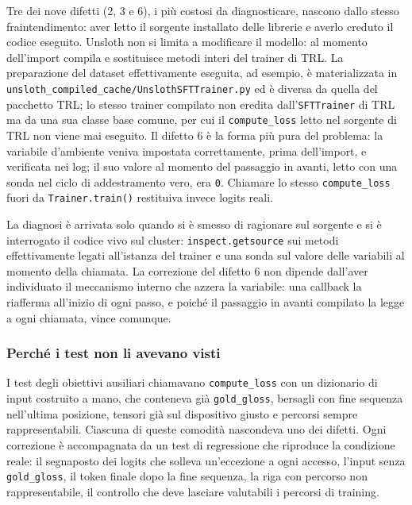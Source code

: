 Tre dei nove difetti (2, 3 e 6), i più costosi da diagnosticare, nascono dallo
stesso fraintendimento: aver letto il sorgente installato delle librerie e
averlo creduto il codice eseguito. Unsloth non si limita a modificare il modello: al
momento dell'import compila e sostituisce metodi interi del trainer di TRL. La
preparazione del dataset effettivamente eseguita, ad esempio, è materializzata
in \texttt{unsloth\_compiled\_cache/UnslothSFTTrainer.py} ed è diversa da quella
del pacchetto TRL; lo stesso trainer compilato non eredita dall'\texttt{SFTTrainer}
di TRL ma da una sua classe base comune, per cui il \texttt{compute\_loss} letto
nel sorgente di TRL non viene mai eseguito. Il difetto 6 è la forma più pura del
problema: la variabile d'ambiente veniva impostata correttamente, prima
dell'import, e verificata nei log; il suo valore al momento del passaggio in
avanti, letto con una sonda nel ciclo di addestramento vero, era \texttt{0}.
Chiamare lo stesso \texttt{compute\_loss} fuori da \texttt{Trainer.train()}
restituiva invece logits reali.

La diagnosi è arrivata solo quando si è smesso di ragionare sul sorgente e si è
interrogato il codice vivo sul cluster: \texttt{inspect.getsource} sui metodi
effettivamente legati all'istanza del trainer e una sonda sul valore delle
variabili al momento della chiamata. La correzione del difetto 6 non dipende
dall'aver individuato il meccanismo interno che azzera la variabile: una
callback la riafferma all'inizio di ogni passo, e poiché il passaggio in avanti
compilato la legge a ogni chiamata, vince comunque.

\subsubsection{Perché i test non li avevano visti}

I test degli obiettivi ausiliari chiamavano \texttt{compute\_loss} con un
dizionario di input costruito a mano, che conteneva già \texttt{gold\_gloss},
bersagli con fine sequenza nell'ultima posizione, tensori già sul dispositivo
giusto e percorsi sempre rappresentabili. Ciascuna di queste comodità
nascondeva uno dei difetti. Ogni correzione è accompagnata da un test di
regressione che riproduce la condizione reale: il segnaposto dei logits che
solleva un'eccezione a ogni accesso, l'input senza \texttt{gold\_gloss}, il
token finale dopo la fine sequenza, la riga con percorso non rappresentabile, il
controllo che deve lasciare valutabili i percorsi di training.

